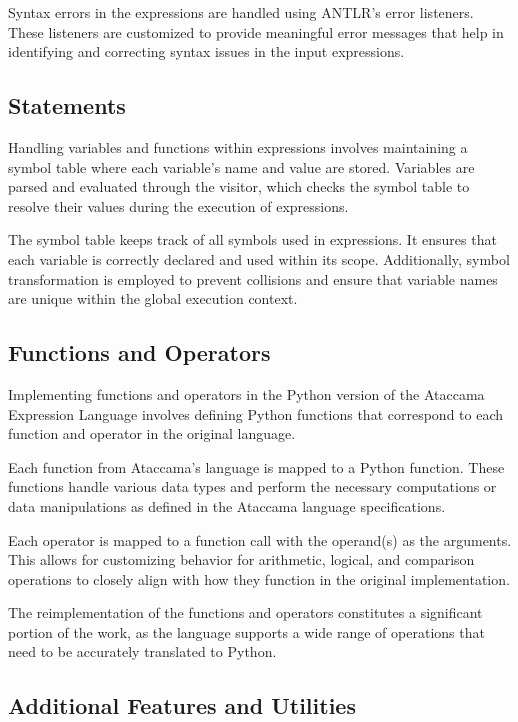 Syntax errors in the expressions are handled using ANTLR's error listeners. These listeners are customized to provide meaningful error messages that help in identifying and correcting syntax issues in the input expressions.

\subsection{Statements}

Handling variables and functions within expressions involves maintaining a symbol table where each variable's name and value are stored. Variables are parsed and evaluated through the visitor, which checks the symbol table to resolve their values during the execution of expressions.

 The symbol table keeps track of all symbols used in expressions. It ensures that each variable is correctly declared and used within its scope. Additionally, symbol transformation is employed to prevent collisions and ensure that variable names are unique within the global execution context.

 \subsection{Functions and Operators}

Implementing functions and operators in the Python version of the Ataccama Expression Language involves defining Python functions that correspond to each function and operator in the original language.

Each function from Ataccama’s language is mapped to a Python function. These functions handle various data types and perform the necessary computations or data manipulations as defined in the Ataccama language specifications.

Each operator is mapped to a function call with the operand(s) as the arguments. This allows for customizing behavior for arithmetic, logical, and comparison operations to closely align with how they function in the original implementation.

The reimplementation of the functions and operators constitutes a significant portion of the work, as the language supports a wide range of operations that need to be accurately translated to Python.

\subsection{Additional Features and Utilities}

